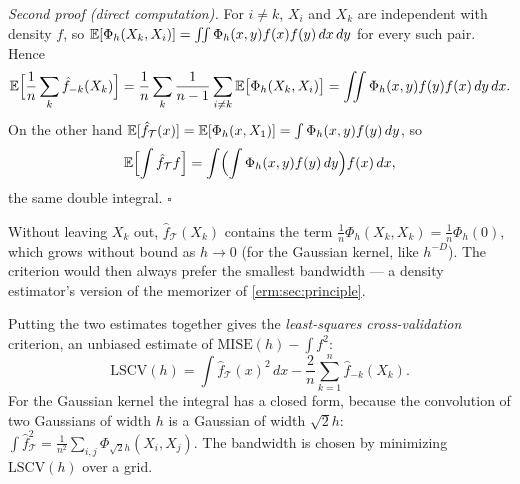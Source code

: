\begin{notechapter}
\emph{Second proof (direct computation).} For $i\neq k$, $X_i$ and $X_k$ are
independent with density $f$, so $\mathbb{E}[\Phi_h(X_k, X_i)] = \iint\Phi_h(x,y)f(x)f(y)\,dx\,dy$
for every such pair. Hence
\[
  \mathbb{E}\Bigl[\frac1n\sum_k\hat f_{-k}(X_k)\Bigr]
  = \frac1n\sum_k\frac1{n-1}\sum_{i\neq k}\mathbb{E}\bigl[\Phi_h(X_k,X_i)\bigr]
  = \iint\Phi_h(x,y)f(y)f(x)\,dy\,dx .
\]
On the other hand
$\mathbb{E}[\hat f_{\mathcal T}(x)] = \mathbb{E}[\Phi_h(x,X_1)] = \int\Phi_h(x,y)f(y)\,dy$, so
\[
  \mathbb{E}\Bigl[\int\hat f_{\mathcal T}f\Bigr] = \int\Bigl(\int\Phi_h(x,y)f(y)\,dy\Bigr)f(x)\,dx,
\]
the same double integral.
\hfill$\square$

\begin{pitfall}
Without leaving $X_k$ out, $\hat f_{\mathcal T}(X_k)$ contains the term
$\frac1n\Phi_h(X_k,X_k) = \frac1n\Phi_h(0)$, which grows without bound as
$h\to0$ (for the Gaussian kernel, like $h^{-D}$). The criterion would then always
prefer the smallest bandwidth --- a density estimator's version of the
memorizer of \cref{erm:sec:principle}.
\end{pitfall}

Putting the two estimates together gives the \emph{least-squares
cross-validation} criterion, an unbiased estimate of
$\mathrm{MISE}(h) - \int f^2$:
\[
  \mathrm{LSCV}(h) = \int\hat f_{\mathcal T}(x)^2\,dx - \frac2n\sum_{k=1}^n\hat f_{-k}(X_k).
\]
For the Gaussian kernel the integral has a closed form, because the convolution
of two Gaussians of width $h$ is a Gaussian of width $\sqrt2h$:
$\int\hat f_{\mathcal T}^2 = \frac1{n^2}\sum_{i,j}\Phi_{\sqrt2h}(X_i,X_j)$. The
bandwidth is chosen by minimizing $\mathrm{LSCV}(h)$ over a grid.


\end{notechapter}
